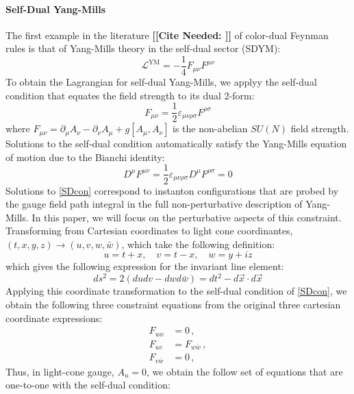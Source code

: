 \documentclass[11pt,letter]{article}
\def\be{\begin{equation}}
\newcommand{\citepls}[1]{{\bf\color{red}[[Cite Needed: #1]]}}
\begin{document}
\paragraph{Self-Dual Yang-Mills} The first example in the literature \citepls{} of color-dual Feynman rules is that of Yang-Mills theory in the self-dual sector (SDYM):
\begin{equation}
\mathcal{L}^{\text{YM}} = -\frac{1}{4}F_{\mu\nu}F^{\mu\nu}
\end{equation}
To obtain the Lagrangian for self-dual Yang-Mills, we applyy the self-dual condition that equates the field strength to its dual 2-form:
\be\label{SDcon}
F_{\mu\nu} = \frac{1}{2} \varepsilon_{\mu\nu\rho\sigma}F^{\rho\sigma}
\end{equation}
where $F_{\mu\nu} = \partial_\mu A_\nu -\partial_\nu A_\mu + g[A_\mu ,A_\nu]$ is the non-abelian $SU(N)$ field strength. Solutions to the self-dual condition automatically satisfy the Yang-Mills equation of motion due to the Bianchi identity:
\begin{equation}
D^\mu F^{\mu\nu} = \frac{1}{2} \varepsilon_{\mu\nu\rho\sigma}D^\mu F^{\rho\sigma} = 0
\end{equation}
Solutions to \cref{SDcon} correspond to instanton configurations that are probed by the gauge field path integral in the full non-perturbative description of Yang-Mills. In this paper, we will focus on the perturbative aspects of this constraint. Transforming from Cartesian coordinates to light cone coordinantes, $(t,x,y,z) \rightarrow (u,v,w,\bar{w})$, which take the following definition:
\begin{equation}
u = t+x,\quad v=t-x, \quad w = y+iz
\end{equation}
which gives the following expression for the invariant line element:
\begin{equation}
ds^2 = 2(dudv - dwd\bar{w}) = dt^2 - d\vec{x}\cdot d\vec{x}
\end{equation}
Applying this coordinate transformation to the self-dual condition of \cref{SDcon}, we obtain the following three constraint equations from the original three cartesian coordinate expressions:
\begin{align} \label{SDLightCone1}
F_{uw} &=0\,,
\\
 \label{SDLightCone2}
 F_{uv} &= F_{w\bar{w}}\,,
\\
 \label{SDLightCone3}
 F_{v\bar{w}} &= 0\,,
\end{align}
Thus, in light-cone gauge, $A_u=0$, we obtain the follow set of equations that are one-to-one with the self-dual condition:
\end{document}
